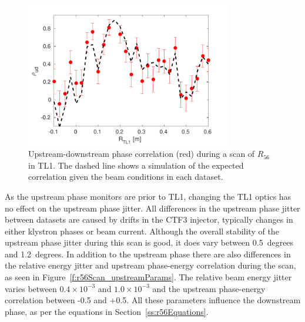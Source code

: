 \begin{figure}
  \centering
  \includegraphics[width=0.8\textwidth]{Figures/propagation/r56Scan_correlation}
  \caption{Upstream-downstream phase correlation (red) during a scan of \(R_{56}\) in TL1. The dashed line shows a simulation of the expected correlation given the beam conditions in each dataset.}
  \label{f:r56Scan_correlation}
\end{figure}

As the upstream phase monitors are prior to TL1, changing the TL1 optics has no effect on the upstream phase jitter. All differences in the upstream phase jitter between datasets are caused by drifts in the CTF3 injector, typically changes in either klystron phases or beam current. Although the overall stability of the upstream phase jitter during this scan is good, it does vary between 0.5~degrees and 1.2~degrees. In addition to the upstream phase there are also differences in the relative energy jitter and upstream phase-energy correlation during the scan, as seen in Figure~\ref{f:r56Scan_upstreamParams}. The relative beam energy jitter varies between \(0.4\times10^{-3}\) and \(1.0\times10^{-3}\) and the upstream phase-energy correlation between -0.5 and +0.5. All these parameters influence the downstream phase, as per the equations in Section~\ref{ss:r56Equations}.

